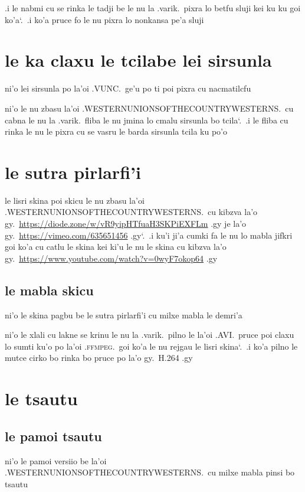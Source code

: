 \documentclass{report}
\newcommand\sds{\spacefactor\sfcode`.\ \space}
\begin{document}
.i le nabmi cu se rinka le tadji be le nu la .varik.\ pixra lo betfu sluji kei ku ku goi ko'a\sds  .i ko'a pruce fo le nu pixra lo nonkansa pe'a sluji

\section{le ka claxu le tcilabe lei sirsunla}
ni'o lei sirsunla po la'oi .VUNC.\ ge'u po ti poi pixra cu nacmatilcfu

ni'o le nu zbasu la'oi .WESTERNUNIONSOFTHECOUNTRYWESTERNS.\ cu cabna le nu la .varik.\ fliba le nu jmina lo cmalu sirsunla bo tcila\sds  .i le fliba cu rinka le nu le pixra cu se vasru le barda sirsunla tcila ku po'o

\section{le sutra pirlarfi'i}
le lisri skina poi skicu le nu zbasu la'oi .WESTERNUNIONSOFTHECOUNTRYWESTERNS.\ cu kibzva la'o gy.\ \url{https://diode.zone/w/vR9yipHTfuaH3SKPiEXFLm} .gy je la'o gy.\ \url{https://vimeo.com/635651456} .gy\sds  .i ku'i ji'a cumki fa le nu lo mabla jifkri goi ko'a cu catlu le skina kei ki'u le nu le skina cu kibzva la'o gy.\ \url{https://www.youtube.com/watch?v=0wyF7okop64} .gy

\subsection{le mabla skicu}
ni'o le skina pagbu be le sutra pirlarfi'i cu milxe mabla le demri'a

ni'o le xlali cu lakne se krinu le nu la .varik.\ pilno le la'oi .AVI.\ pruce poi claxu lo sumti ku'o po la'oi .\textsc{ffmpeg}.\ goi ko'a le nu rejgau le lisri skina\sds  .i ko'a pilno le mutce cirko bo rinka bo pruce po la'o gy.\ H.264 .gy

\section{le tsautu}
\subsection{le pamoi tsautu}
ni'o le pamoi versiio be la'oi .WESTERNUNIONSOFTHECOUNTRYWESTERNS.\ cu milxe mabla pinsi bo tsautu
\end{document}
